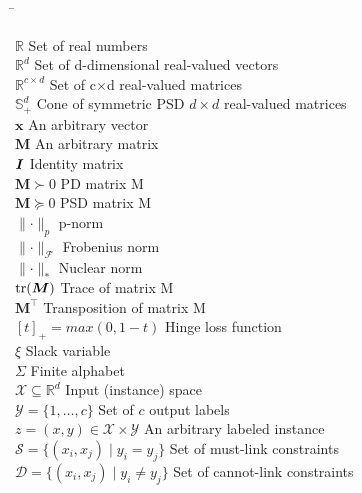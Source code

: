

\begin{tabbing}
\hspace{150pt}\=\kill

$\mathbb{R}$ \> Set of real numbers \\
$\mathbb{R}^d$ \> Set of d-dimensional real-valued vectors \\
$\mathbb{R}^{c \times d}$ \> Set of c$\times$d real-valued matrices \\
$\mathbb{S}^{d}_+$ \> Cone of symmetric PSD $d \times d$ real-valued matrices \\

$\textbf{x}$ \> An arbitrary vector \\
$\bm{M}$ \> An arbitrary matrix \\
$\textbf{\textit{I}}$ \> Identity matrix \\
$\bm{M} \succ 0$ \> PD matrix M \\
$\bm{M} \succeq 0$ \> PSD matrix M \\
$\parallel \cdot \parallel_p$ \> p-norm \\
$\parallel \cdot \parallel_\mathcal{F}$ \> Frobenius norm \\
$\parallel \cdot \parallel_*$ \> Nuclear norm \\
$\operatorname*{tr}(\bm{M})$ \> Trace of matrix M \\
$\bm{M}^\top$ \> Transposition of matrix M \\
$[t]_+ = max(0, 1-t)$ \> Hinge loss function \\
$\xi$ \> Slack variable \\
$\Sigma$ \> Finite alphabet \\

$\mathcal{X} \subseteq \mathbb{R}^d$ \> Input (instance) space \\
$\mathcal{Y} = \{ 1, \ldots ,c \}$ \> Set of $c$ output labels \\
$z=(x,y) \in \mathcal{X} \times \mathcal{Y}$ \> An arbitrary labeled instance \\

$\mathcal{S} = \{ (x_i, x_j) \mid y_i = y_j \}$ \> Set of must-link constraints \\
$\mathcal{D} = \{ (x_i, x_j) \mid y_i \neq y_j \}$ \> Set of cannot-link constraints \\


\end{tabbing}
